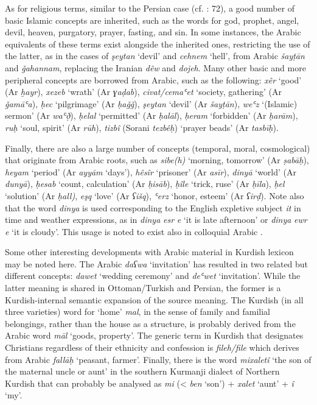 \documentclass[output=paper]{langsci/langscibook}
\begin{document}
As for religious terms, similar to the Persian case (cf. \citealt{Perry2012}: 72), a good number of basic Islamic concepts are inherited, such as the words for god, prophet, angel, devil, heaven, purgatory, prayer, fasting, and sin. In some instances, the Arabic equivalents of these terms exist alongside the inherited ones, restricting the use of the latter, as in the cases of \textit{şeytan} ‘devil’ and \textit{cehnem} ‘hell’, from Arabic \textit{šayṭān} and \textit{ǧahannam}, replacing the Iranian \textit{dêw} and \textit{dojeh}. Many other basic and more peripheral concepts are borrowed from Arabic, such as the following: \textit{xêr} ‘good’ (Ar \textit{ḫayr}), \textit{xezeb} ‘wrath’ (Ar \textit{ɣaḍab}), \textit{civat/cemaʿet} ‘society, gathering’ (Ar \textit{ǧamāʿa}), \textit{ḥec} ‘pilgrimage’ (Ar \textit{ḥaǧǧ}), \textit{şeytan} ‘devil’ (Ar \textit{šayṭān}), \textit{weʿz} ‘(Islamic) sermon’ (Ar \textit{waʿð̣}), \textit{ḥelal} ‘permitted’ (Ar \textit{ḥalāl}), \textit{ḥeram} ‘forbidden’ (Ar \textit{ḥarām}), \textit{ruḥ} ‘soul, spirit’ (Ar \textit{rūh}), \textit{tizbî} (Sorani \textit{tezbêḥ}) ‘prayer beads’ (Ar \textit{tasbīḥ}).  

Finally, there are also a large number of concepts (temporal, moral, cosmological) that originate from Arabic roots, such as \textit{sibe(h)} ‘morning, tomorrow’ (Ar \textit{ṣabāḥ}), \textit{heyam} ‘period’ (Ar \textit{ayyām} ‘days’), \textit{hêsîr} ‘prisoner’ (Ar \textit{asīr}), \textit{dinyā} ‘world’ (Ar \textit{dunyā}), \textit{ḥesab} ‘count, calculation’ (Ar \textit{ḥisāb}), \textit{ḥîle} ‘trick, ruse’ (Ar \textit{ḥīla}), \textit{ḥel}  ‘solution’ (Ar \textit{ḥall)}, \textit{eşq} ‘love’ (Ar \textit{ʕišq}), \textit{ʿerz} ‘honor, esteem’ (Ar \textit{ʕirḍ}). Note also that the word \textit{dinya} is used corresponding to the English expletive subject \textit{it} in time and weather expressions, as in \textit{dinya} \textit{esr} \textit{e} ‘it is late afternoon’ or \textit{dinya} \textit{ewr} \textit{e} ‘it is cloudy’. This usage is noted to exist also in colloquial Arabic \citep[155]{Chyet2003}.

Some other interesting developments with Arabic material in Kurdish lexicon may be noted here. The Arabic \textit{daʕwa} ‘invitation’ has resulted in two related but different concepts: \textit{dawet} ‘wedding ceremony’ and \textit{deʿwet} ‘invitation’. While the latter meaning is shared in Ottoman/Turkish and Persian, the former is a Kurdish-internal semantic expansion of the source meaning. The Kurdish (in all three varieties) word for ‘home’ \textit{mal}, in the sense of family and familial belongings, rather than the house as a structure, is probably derived from the Arabic word \textit{māl} ‘goods, property’. The generic term in Kurdish that designates Christians regardless of their ethnicity and confession is \textit{fileh/file} which derives from Arabic \textit{fallāḥ} ‘peasant, farmer’. Finally, there is the word \textit{mixaletî} ‘the son of the maternal uncle or aunt’ in the southern Kurmanji dialect of Northern Kurdish that can probably be analysed as \textit{mi} (< \textit{ben} ‘son’) + \textit{xalet} ‘aunt’ + \textit{î} ‘my’.
\end{document}

